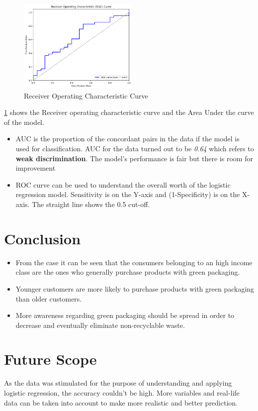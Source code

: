 \documentclass[a4paper,10pt]{article}
\begin{document}
\vspace{10pt}
\begin{figure}[ht]
\centering
\includegraphics[height=4.5cm]{figures/AUC_ROC.png}
\caption{Receiver Operating Characteristic Curve} 
\label{auc}
\end{figure} 

\vspace{30pt}
\ref{auc} shows the Receiver operating characteristic curve and the Area Under the curve of the model.
\begin{itemize}
    \item AUC is the proportion of the concordant pairs in the data if the model is used for classification. AUC for the data turned out to be \textit{0.64} which refers to \textbf{weak discrimination}. The model's performance is fair but there is room for improvement

    \item ROC curve can be used to understand the overall worth of the logistic regression model. Sensitivity is on the Y-axis and (1-Specificity) is on the X-axis. The straight line shows the 0.5 cut-off.
\end{itemize}


\section{Conclusion}
\begin{itemize}
    \item From the case it can be seen that the consumers belonging to an high income class are the ones who generally purchase products with green packaging. 
    \item Younger customers are more likely to purchase products with green packaging than older customers. 
    \item More awareness regarding green packaging should be spread in order to decrease and eventually eliminate non-recyclable waste.
\end{itemize}

\section{Future Scope}

As the data was stimulated for the purpose of understanding and applying logistic regression, the accuracy couldn't be high. More variables and real-life data can be taken into account to make more realistic and better prediction.



\fontsize{8}{9}\selectfont




\clearpage
\end{document}
